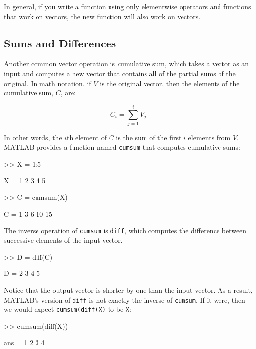 In general, if you write a function using only elementwise
operators and functions that work on vectors, the new
function will also work on vectors.


\subsection{Sums and Differences}

Another common vector operation is {\emph cumulative sum}, which takes a
vector as an input and computes a new vector that contains all of the
partial sums of the original.  In math notation, if $V$ is the
original vector, then the elements of the cumulative sum, $C$, are:


\begin{equation}
C_i = \sum_{j=1}^i V_j
\end{equation}

In other words, the $i$th element of $C$ is the sum of the first
$i$ elements from $V$.  MATLAB provides a function named {\tt cumsum}
that computes cumulative sums:


\begin{code}
>> X = 1:5

X = 1     2     3     4     5

>> C = cumsum(X)

C = 1     3     6    10    15
\end{code}

The inverse operation of {\tt cumsum} is {\tt diff}, which computes
the difference between successive elements of the input vector.


\begin{code}
>> D = diff(C)

D = 2     3     4     5
\end{code}

Notice that the output vector is shorter by one than the input
vector.  As a result, MATLAB's version of {\tt diff} is not
exactly the inverse of {\tt cumsum}.  If it were, then we would
expect {\tt cumsum(diff(X)} to be {\tt X}:

\begin{code}
>> cumsum(diff(X))

ans = 1     2     3     4
\end{code}

